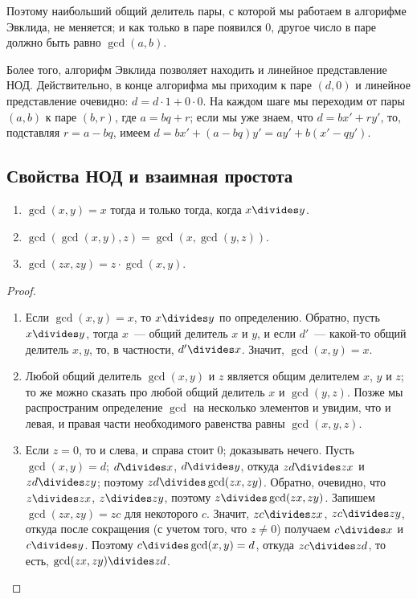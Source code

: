 Поэтому
наибольший общий делитель пары, с которой мы работаем в алгорифме
Эвклида, не меняется; и как только в паре
появился $0$, другое число в паре должно быть равно $\gcd(a,b)$.

Более того, алгорифм Эвклида позволяет находить и линейное
представление НОД. Действительно, в конце алгорифма мы приходим к паре
$(d,0)$ и линейное представление очевидно: $d=d\cdot 1+0\cdot 0$. На
каждом шаге мы переходим от пары $(a,b)$ к паре $(b,r)$, где $a=bq+r$;
если мы уже знаем, что $d=bx'+ry'$, то, подставляя $r=a-bq$, имеем
$d=bx'+(a-bq)y'= ay'+b(x'-qy')$.

\subsection{Свойства НОД и взаимная простота}


\begin{proposition}\label{prop_properties_gcd}
\begin{enumerate}
\item $\gcd(x,y)=x$ тогда и только тогда, когда $x\divides y$.\label{gcd_prop1}
\item $\gcd(\gcd(x,y),z)=\gcd(x,\gcd(y,z))$.
\item $\gcd(zx,zy)=z\cdot\gcd(x,y)$.
\end{enumerate}
\end{proposition}
\begin{proof}
\begin{enumerate}
\item Если $\gcd(x,y)=x$, то $x\divides y$ по определению. Обратно, пусть
  $x\divides y$, тогда $x$~--- общий делитель $x$ и $y$, и если $d'$~---
  какой-то общий делитель $x,y$, то, в частности, $d'\divides x$. Значит,
  $\gcd(x,y)=x$.
\item Любой общий делитель $\gcd(x,y)$ и $z$ является общим делителем
  $x$, $y$ и $z$; то же можно сказать про любой общий делитель $x$ и
  $\gcd(y,z)$. Позже мы распространим определение $\gcd$ на несколько
  элементов и увидим, что и левая, и правая части необходимого
  равенства равны $\gcd(x,y,z)$.
\item Если $z=0$, то и слева, и справа стоит $0$; доказывать
  нечего. Пусть $\gcd(x,y)=d$; $d\divides x$, $d\divides y$, откуда
  $zd\divides zx$ и $zd\divides zy$; поэтому $zd\divides \gcd(zx,zy)$.
  Обратно, очевидно, что $z\divides zx$, $z\divides zy$,
  поэтому $z\divides\gcd(zx,zy)$. Запишем $\gcd(zx,zy)=zc$ для некоторого
  $c$. Значит, $zc\divides zx$, $zc\divides zy$, откуда после
  сокращения (с учетом того, что $z\neq 0$) получаем $c\divides x$ и
  $c\divides y$. Поэтому $c\divides \gcd(x,y)=d$, откуда
  $zc\divides zd$, то есть, $\gcd(zx,zy)\divides zd$.
\end{enumerate}
\end{proof}

